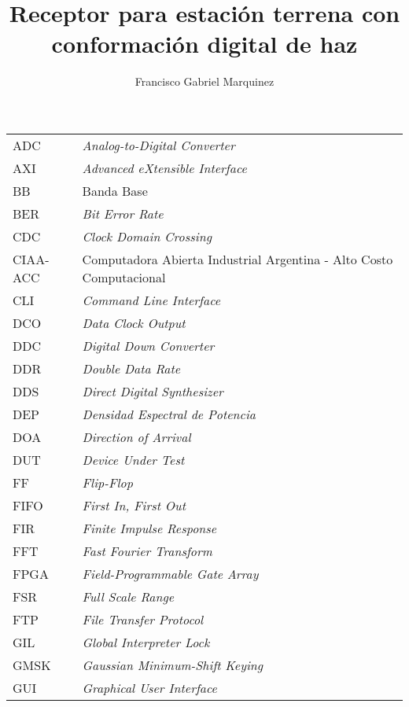 \documentclass[screen, pagebackref,oneside]{ibtesis}
\title{Receptor para estación terrena con conformación digital de haz}
\author{Francisco Gabriel Marquinez}
\begin{document}
\begin{preliminary}


    \begin{abreviaturas}
        \begin{longtable}{ll}
            ADC &   \textit{Analog-to-Digital Converter} \\
            AXI &   \textit{Advanced eXtensible Interface}  \\
            BB  &   Banda Base  \\
            BER &   \textit{Bit Error Rate} \\
            CDC &   \textit{Clock Domain Crossing}  \\
            CIAA-ACC & Computadora Abierta Industrial Argentina - Alto Costo Computacional  \\
            CLI &   \textit{Command Line Interface} \\  
            DCO &   \textit{Data Clock Output}  \\
            DDC &   \textit{Digital Down Converter} \\
            DDR &   \textit{Double Data Rate}   \\
            DDS &   \textit{Direct Digital Synthesizer} \\
            DEP &   \textit{Densidad Espectral de Potencia} \\   
            DOA &   \textit{Direction of Arrival}   \\
            DUT &   \textit{Device Under Test}  \\
            FF  &   \textit{Flip-Flop}  \\
            FIFO &  \textit{First In, First Out}    \\
            FIR &   \textit{Finite Impulse Response}    \\
            FFT &   \textit{Fast Fourier Transform} \\
            FPGA &  \textit{Field-Programmable Gate Array} \\
            FSR &   \textit{Full Scale Range}   \\
            FTP &   \textit{File Transfer Protocol} \\
            GIL &   \textit{Global Interpreter Lock}    \\
            GMSK &  \textit{Gaussian Minimum-Shift Keying} \\
            GUI &   \textit{Graphical User Interface}   \\

\end{longtable}
\end{abreviaturas}
\end{preliminary}
\end{document}
